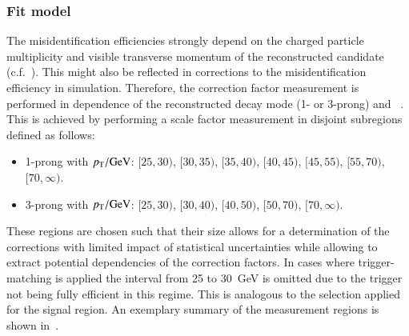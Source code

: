 \subsubsection{Fit model}

The \jettotauhadvis misidentification efficiencies strongly depend on
the charged particle multiplicity and visible transverse momentum of
the reconstructed \tauhadvis candidate (c.f.\ ). This
might also be reflected in corrections to the \jettotauhadvis
misidentification efficiency in simulation. Therefore, the correction
factor measurement is performed in dependence of the reconstructed
decay mode (1- or 3-prong) and \tauhadvis~\pT. This is achieved by
performing a scale factor measurement in disjoint subregions defined
as follows:
\begin{itemize}

\item 1-prong \tauhadvis with $\pT / \si{\GeV}$: $[25, 30)$, $[30, 35)$,
  $[35, 40)$, $[40, 45)$, $[45, 55)$, $[55, 70)$, $[70, \infty)$.

\item 3-prong \tauhadvis with $\pT / \si{\GeV}$: $[25, 30)$, $[30, 40)$,
  $[40, 50)$, $[50, 70)$, $[70, \infty)$.

\end{itemize}
These regions are chosen such that their size allows for a
determination of the corrections with limited impact of statistical
uncertainties while allowing to extract potential \pT dependencies of
the correction factors. In cases where trigger-matching is applied the
\tauhadvis \pT interval from 25 to \SI{30}{\GeV} is omitted due to the
trigger not being fully efficient in this regime. This is analogous to
the selection applied for the \hadhad signal region. An exemplary
summary of the measurement regions is shown
in~.

